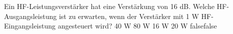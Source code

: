     {Ein HF-Leistungsverstärker hat eine Verstärkung von 16 dB. Welche HF-Ausgangsleistung ist zu erwarten, wenn der Verstärker mit 1 W HF-Eingangsleistung angesteuert wird?}
    {40 W}
    {80 W}
    {16 W}
    {20 W}
    {false}{false}